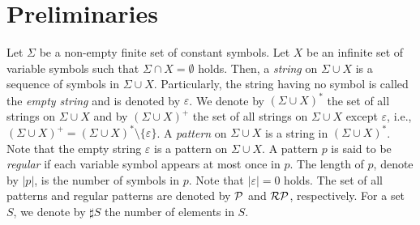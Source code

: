 \section{Preliminaries}

Let $\Sigma$ be a non-empty finite set of constant symbols.
Let $X$ be an infinite set of variable symbols such that $\Sigma \cap X = \emptyset$ holds.
Then, a \textit{string} on $\Sigma \cup X$ is a sequence of symbols in $\Sigma \cup X$.
Particularly, the string having no symbol is called the \textit{empty string} and is denoted by $\varepsilon$.
We denote by $(\Sigma \cup X)^{\ast}$ the set of all strings on $\Sigma \cup X$ 
and by $(\Sigma \cup X)^{+}$ the set of all strings on $\Sigma\cup X$ except $\varepsilon$, i.e., $(\Sigma \cup X)^{+}=(\Sigma \cup X)^{\ast}\setminus \{\varepsilon\}$.
A \textit{pattern} on $\Sigma \cup X$ is a string in $(\Sigma \cup X)^{\ast}$.
Note that the empty string $\varepsilon$ is a pattern on $\Sigma \cup X$.
A pattern $p$ is said to be \textit{regular} if each variable symbol appears
at most once in $p$.
The length of $p$, denote by $|p|$, is the number of symbols in $p$.
Note that $|\varepsilon|=0$ holds.
The set of all patterns and regular patterns are denoted by $\mathcal{P}$ and $\mathcal{RP}$, respectively.
For a set $S$, we denote by $\sharp S$ the number of elements in $S$.
